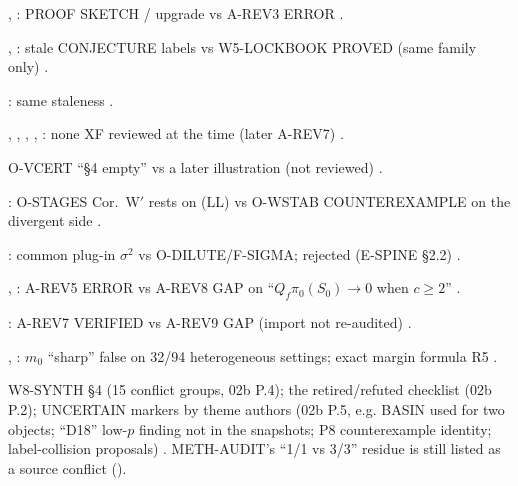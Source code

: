 \begin{uncertain}
, : PROOF SKETCH / upgrade vs A-REV3 ERROR .
\end{uncertain}
\begin{uncertain}[C18 · Cost-T38, T32(i)]
, : stale CONJECTURE labels vs W5-LOCKBOOK PROVED (same family only) .
\end{uncertain}
\begin{uncertain}[C19 · SEP-E]
: same staleness .
\end{uncertain}
\begin{uncertain}
, , , , : none XF reviewed at the time (later A-REV7) .
\end{uncertain}
\begin{uncertain}[C21 · O-CERT §4]
O-VCERT ``§4 empty'' vs a later illustration (not reviewed) .
\end{uncertain}
\begin{uncertain}[C22 · STG-Wp]
: O-STAGES Cor.~W$'$ rests on (LL) vs O-WSTAB COUNTEREXAMPLE on the divergent side .
\end{uncertain}
\begin{uncertain}[C23 · OMIX-C1]
: common plug-in $\sigma^2$ vs O-DILUTE/F-SIGMA; rejected (E-SPINE §2.2) .
\end{uncertain}
\begin{uncertain}
, : A-REV5 ERROR vs A-REV8 GAP on ``$Q_f\pi_0(S_0)\to0$ when $c\ge2$'' .
\end{uncertain}
\begin{uncertain}[C25 · SEP-GU]
: A-REV7 VERIFIED vs A-REV9 GAP (import not re-audited) .
\end{uncertain}
\begin{uncertain}
, : $m_0$ ``sharp'' false on 32/94 heterogeneous settings; exact margin formula R5 .
\end{uncertain}
\begin{uncertain}
W8-SYNTH §4 (15 conflict groups, 02b P.4); the retired/refuted checklist (02b P.2); UNCERTAIN markers by theme authors (02b P.5, e.g. BASIN used for two objects; ``D18'' low-$p$ finding not in the snapshots; P8 counterexample identity; label-collision proposals) . METH-AUDIT's ``1/1 vs 3/3'' residue is still listed as a source conflict ().
\end{uncertain}

